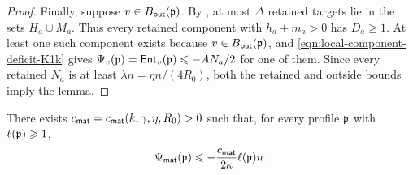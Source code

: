 \begin{proof}
Finally, suppose $v\in B_{\hspace{0.2mm}\mathsf{out}}({\mathfrak p})$. By , at most $\Delta$ retained targets lie in the sets $H_a\cup M_a$. Thus every retained component with $h_a+m_a>0$ has $D_a\geq1$. At least one such component exists because $v\in B_{\hspace{0.2mm}\mathsf{out}}({\mathfrak p})$, and \eqref{eqn:local-component-deficit-K1k} gives $\Psi_v({\mathfrak p})={\mathsf{Ent}}_v({\mathfrak p})\leqslant-AN_a/2$ for one of them. Since every retained $N_a$ is at least $\lambda n=\eta n/(4R_0)$, both the retained and outside bounds imply the lemma.
\end{proof}

\begin{lemma}\label{lemma:residual-matching-estimate-K1k}
There exists $c_{\mathsf{mat}}=c_{\mathsf{mat}}(k,\gamma,\eta,R_0)>0$ such that, for every profile ${\mathfrak p}$ with $\ell({\mathfrak p})\geqslant1$,
$$\Psi_{\mathsf{mat}}({\mathfrak p})\leqslant-\frac{c_{\mathsf{mat}}}{2\kappa}\ell({\mathfrak p})n\,.$$
\end{lemma}
